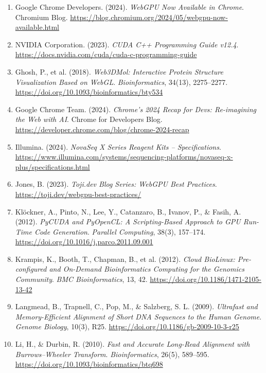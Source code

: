 \documentclass[PhD]{PHlab-thesis}
\begin{document}
\begin{enumerate}
  \item Google Chrome Developers. (2024). \emph{WebGPU Now Available in Chrome}. Chromium Blog. \url{https://blog.chromium.org/2024/05/webgpu-now-available.html}

  \item NVIDIA Corporation. (2023). \emph{CUDA C++ Programming Guide v12.4}. \url{https://docs.nvidia.com/cuda/cuda-c-programming-guide}

  \item Ghosh, P., et al. (2018). \emph{Web3DMol: Interactive Protein Structure Visualization Based on WebGL}. \textit{Bioinformatics}, 34(13), 2275–2277. \url{https://doi.org/10.1093/bioinformatics/bty534}

  \item Google Chrome Team. (2024). \emph{Chrome's 2024 Recap for Devs: Re-imagining the Web with AI}. Chrome for Developers Blog. \url{https://developer.chrome.com/blog/chrome-2024-recap}

  \item Illumina. (2024). \emph{NovaSeq X Series Reagent Kits – Specifications}. \url{https://www.illumina.com/systems/sequencing-platforms/novaseq-x-plus/specifications.html}

  \item Jones, B. (2023). \emph{Toji.dev Blog Series: WebGPU Best Practices}. \url{https://toji.dev/webgpu-best-practices/}

  \item Klöckner, A., Pinto, N., Lee, Y., Catanzaro, B., Ivanov, P., \& Fasih, A. (2012). \emph{PyCUDA and PyOpenCL: A Scripting-Based Approach to GPU Run-Time Code Generation}. \textit{Parallel Computing}, 38(3), 157–174. \url{https://doi.org/10.1016/j.parco.2011.09.001}

  \item Krampis, K., Booth, T., Chapman, B., et al. (2012). \emph{Cloud BioLinux: Pre-configured and On-Demand Bioinformatics Computing for the Genomics Community}. \textit{BMC Bioinformatics}, 13, 42. \url{https://doi.org/10.1186/1471-2105-13-42}

  \item Langmead, B., Trapnell, C., Pop, M., \& Salzberg, S. L. (2009). \emph{Ultrafast and Memory-Efficient Alignment of Short DNA Sequences to the Human Genome}. \textit{Genome Biology}, 10(3), R25. \url{https://doi.org/10.1186/gb-2009-10-3-r25}

  \item Li, H., \& Durbin, R. (2010). \emph{Fast and Accurate Long-Read Alignment with Burrows–Wheeler Transform}. \textit{Bioinformatics}, 26(5), 589–595. \url{https://doi.org/10.1093/bioinformatics/btq698}


\end{enumerate}
\end{document}
